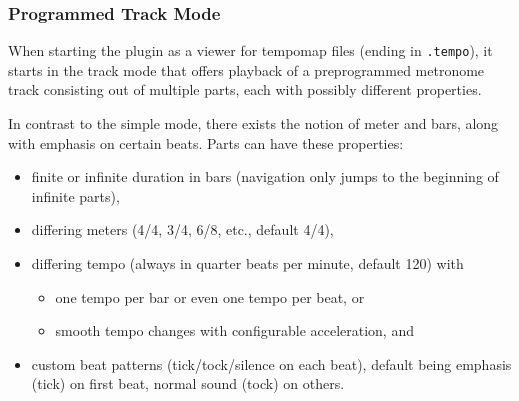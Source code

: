 \subsubsection{Programmed Track Mode}

When starting the plugin as a viewer for tempomap files
(ending in \verb:.tempo:), it starts in the track mode that offers
playback of a preprogrammed metronome track consisting out of
multiple parts, each with possibly different properties.

In contrast to the simple mode, there exists the notion of
meter and bars, along with emphasis on certain beats.
Parts can have these properties:

\begin{itemize}
    \item finite or infinite duration in bars (navigation only jumps
        to the beginning of infinite parts),
    \item differing meters (4/4, 3/4, 6/8, etc., default 4/4),
    \item differing tempo (always in quarter beats per minute,
        default 120) with
    \begin{itemize}
        \item one tempo per bar or even one tempo per beat, or
        \item smooth tempo changes with configurable acceleration, and
    \end{itemize}
    \item custom beat patterns (tick/tock/silence on each beat),
        default being emphasis (tick) on first beat, normal sound
        (tock) on others.
\end{itemize}

